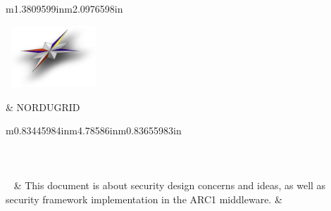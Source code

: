 \documentclass{article}
\title{}
\begin{document}
\begin{flushleft}
\tablehead{}\begin{supertabular}{m{1.3809599in}m{2.0976598in}}
\begin{center}
\includegraphics[width=1.4228in,height=0.9098in]{SecurityFrameworkofARC1-img1.jpg}
\end{center}
 &
\scshape\color{black} \newline
\newline
NORDUGRID\\
\end{supertabular}
\end{flushleft}

\bigskip


\bigskip

\begin{flushleft}
\tablehead{}\begin{supertabular}{m{0.83445984in}m{4.78586in}m{0.83655983in}}
\\
\\
\\
\\
~
 &
\color{black} This document is about security
design concerns and ideas, as well as security framework implementation
in the ARC1 middleware. &
~
\\
\end{supertabular}
\end{flushleft}

\setcounter{tocdepth}{9}
\renewcommand\contentsname{}
\tableofcontents
\end{document}
